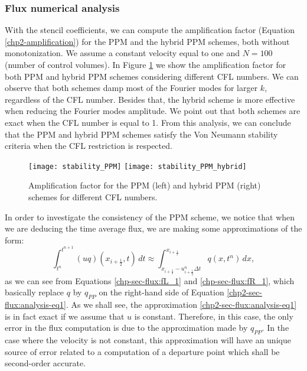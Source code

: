 \subsubsection{Flux numerical analysis}
With the stencil coefficients, we can compute the amplification factor 
(Equation \eqref{chp2-amplification}) for the PPM and the hybrid PPM schemes, both without monotonization.
We assume a constant velocity equal to one and $N=100$ (number of control volumes).
In Figure \ref{chp2-fig-amplification} we show the amplification factor for both PPM and hybrid PPM schemes
considering different CFL numbers.
We can observe that both schemes damp most of the Fourier modes for larger $k$, regardless of the CFL number.
Besides that, the hybrid scheme is more effective when reducing the Fourier modes amplitude.
We point out that both schemes are exact when the CFL number is equal to 1.
From this analysis, we can conclude that the PPM and hybrid PPM schemes satisfy the
Von Neumann stability criteria when the CFL restriction is respected.
\begin{figure}[ht]
	\centering
	\texttt{[image: stability\_PPM]}
	\texttt{[image: stability\_PPM\_hybrid]}
	\caption{Amplification factor for the PPM (left) and hybrid PPM (right) schemes for different CFL numbers.}
	\label{chp2-fig-amplification}
\end{figure}

In order to investigate the consistency of the PPM scheme, we notice that when we are deducing the time average flux, 
we are making some approximations of the form:
\begin{equation}
	\label{chp2-sec-flux:analysis-eq1}
	\int_{t^n}^{t^{n+1}} (uq)(x_{i+\frac{1}{2}},t) \,dt \approx
  \int_{x_{i+\frac{1}{2}}-u_{i+\frac{1}{2}}^n \Delta t}^{x_{i+\frac{1}{2}}}
	q(x,t^n)\,dx, 
\end{equation}
as we can see from Equations \eqref{chp-sec-flux:fL_1} and \eqref{chp-sec-flux:fR_1},
which basically replace $q$ by $q_{PP}$ on the right-hand side of Equation
\eqref{chp2-sec-flux:analysis-eq1}.
As we shall see, the approximation \eqref{chp2-sec-flux:analysis-eq1}
is in fact exact if we assume that $u$ is constant.
Therefore, in this case, the only error in the flux computation is due to the approximation made by $q_{PP}$. 
In the case where the velocity is not constant, this approximation will have an unique source of 
error related to a computation of a departure point which shall be second-order accurate.

